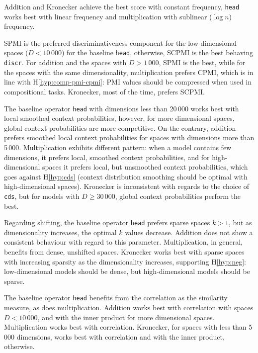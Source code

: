 
Addition and Kronecker achieve the best score with constant frequency, \texttt{head} works best with linear frequency and multiplication with sublinear ($\log n$) frequency.

SPMI is the preferred discriminativeness component for the low-dimensional spaces ($D < 10\,000$) for the baseline \texttt{head}, otherwise, SCPMI is the best behaving \texttt{discr}. For addition and the spaces with $D > 1\,000$, SPMI is the best, while for the spaces with the same dimensionality, multiplication prefers CPMI, which is in line with H\ref{hyp:comp-pmi-cpmi}: PMI values should be compressed when used in compositional tasks. Kronecker, most of the time, prefers SCPMI.

The baseline operator \texttt{head} with dimensions less than 20\,000 works best with local smoothed context probabilities, however, for more dimensional spaces, global context probabilities are more competitive. On the contrary, addition prefers smoothed local context probabilities for spaces with dimensions more than 5\,000. Multiplication exhibits different pattern: when a model contains few dimensions, it prefers local, smoothed context probabilities, and for high-dimensional spaces it prefers local, but unsmoothed context probabilities, which goes against H\ref{hyp:cds} (context distribution smoothing should be optimal with high-dimensional spaces). Kronecker is inconsistent with regards to the choice of \texttt{cds}, but for models with $D \geq 30\,000$, global context probabilities perform the best.

Regarding shifting, the baseline operator \texttt{head} prefers sparse spaces $k > 1$, but as dimensionality increases, the optimal $k$ values decrease. Addition does not show a consistent behaviour with regard to this parameter. Multiplication, in general, benefits from dense, unshifted spaces. Kronecker works best with sparse spaces with increasing sparsity as the dimensionality increases, supporting H\ref{hyp:neg}: low-dimensional models should be dense, but high-dimensional models should be sparse.

The baseline operator \texttt{head} benefits from the correlation as the similarity measure, as does multiplication. Addition works best with correlation with spaces $D < 10\,000$, and with the inner product for more dimensional spaces. Multiplication works best with correlation. Kronecker, for spaces with less than 5\,000 dimensions, works best with correlation and with the inner product, otherwise.

